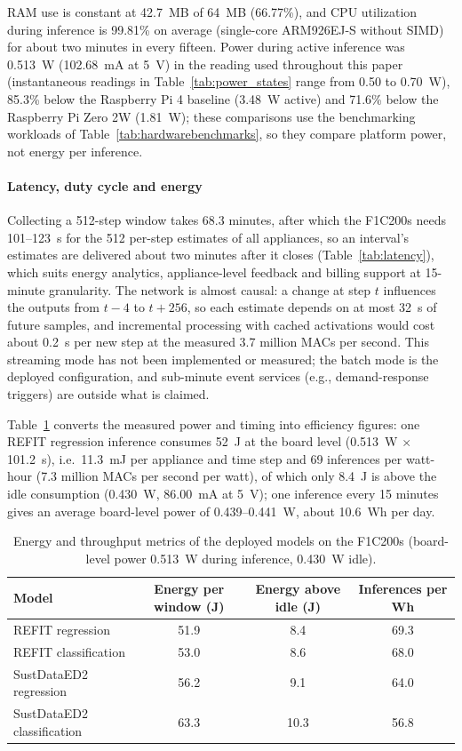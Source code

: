 \documentclass[fleqn,10pt]{wlscirep}
\begin{document}
RAM use is constant at 42.7~MB of 64~MB (66.77\%), and CPU utilization during inference is 99.81\% on average (single-core ARM926EJ-S without SIMD) for about two minutes in every fifteen. Power during active inference was 0.513~W (102.68~mA at 5~V) in the reading used throughout this paper (instantaneous readings in Table~\ref{tab:power_states} range from 0.50 to 0.70~W), 85.3\% below the Raspberry Pi 4 baseline (3.48~W active) and 71.6\% below the Raspberry Pi Zero 2W (1.81~W); these comparisons use the benchmarking workloads of Table~\ref{tab:hardwarebenchmarks}, so they compare platform power, not energy per inference.

\paragraph{Latency, duty cycle and energy}
\label{subsubsec:latency}
Collecting a 512-step window takes 68.3 minutes, after which the F1C200s needs 101--123~s for the 512 per-step estimates of all appliances, so an interval's estimates are delivered about two minutes after it closes (Table~\ref{tab:latency}), which suits energy analytics, appliance-level feedback and billing support at 15-minute granularity. The network is almost causal: a change at step $t$ influences the outputs from $t-4$ to $t+256$, so each estimate depends on at most 32~s of future samples, and incremental processing with cached activations would cost about 0.2~s per new step at the measured 3.7 million MACs per second. This streaming mode has not been implemented or measured; the batch mode is the deployed configuration, and sub-minute event services (e.g., demand-response triggers) are outside what is claimed.


Table~\ref{tab:energy} converts the measured power and timing into efficiency figures: one REFIT regression inference consumes 52~J at the board level (0.513~W $\times$ 101.2~s), i.e.\ 11.3~mJ per appliance and time step and 69 inferences per watt-hour (7.3 million MACs per second per watt), of which only 8.4~J is above the idle consumption (0.430~W, 86.00~mA at 5~V); one inference every 15 minutes gives an average board-level power of 0.439--0.441~W, about 10.6~Wh per day.

\begin{table}[!t]
\centering
\caption{Energy and throughput metrics of the deployed models on the F1C200s (board-level power 0.513~W during inference, 0.430~W idle).}
\label{tab:energy}
\footnotesize
\begin{tabular}{@{}lccc@{}}
\toprule
Model & Energy per window (J) & Energy above idle (J) & Inferences per Wh \\
\midrule
REFIT regression & 51.9 & 8.4 & 69.3 \\
REFIT classification & 53.0 & 8.6 & 68.0 \\
SustDataED2 regression & 56.2 & 9.1 & 64.0 \\
SustDataED2 classification & 63.3 & 10.3 & 56.8 \\
\bottomrule
\end{tabular}
\end{table}
\end{document}
